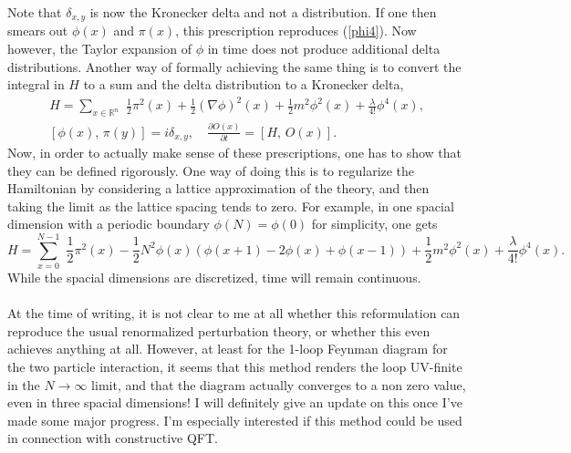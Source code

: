 \documentclass{article}
\begin{document}
Note that $\delta_{x,y}$ is now the Kronecker delta and not a distribution.
If one then smears out $\phi(x)$ and $\pi(x)$, this prescription reproduces (\ref{phi4}).
Now however, the Taylor expansion of $\phi$ in time does not produce additional delta distributions.
Another way of formally achieving the same thing is to convert the integral in $H$ to a sum and the delta distribution to a Kronecker delta,
\begin{equation}\begin{gathered}
    H = \sum_{x\in \mathbb{R}^n} \,\, \frac{1}{2} \pi^2(x) + \frac{1}{2} (\nabla\phi)^2(x) + \frac{1}{2} m^2\phi^2(x) + \frac{\lambda}{4!} \phi^4(x),\\
    \left[\phi(x),\,\pi(y)\right] = i\delta_{x, y}, \quad \frac{\partial O(x)}{\partial t} = \left[H,\,O(x)\right].
\end{gathered}\end{equation}
Now, in order to actually make sense of these prescriptions, one has to show that they can be defined rigorously.
One way of doing this is to regularize the Hamiltonian by considering a lattice approximation of the theory,
and then taking the limit as the lattice spacing tends to zero. For example, in one spacial dimension with a periodic boundary $\phi(N) = \phi(0)$ for simplicity, one gets
\begin{equation}
    H = \sum_{x = 0}^{N-1} \,\, \frac{1}{2} \pi^2(x) - \frac{1}{2} N^2 \phi(x)\left( \phi(x+1) - 2\phi(x) + \phi(x-1) \right) + \frac{1}{2} m^2\phi^2(x) + \frac{\lambda}{4!} \phi^4(x).
\end{equation}
While the spacial dimensions are discretized, time will remain continuous.\\\\
At the time of writing, it is not clear to me at all whether this reformulation can reproduce the usual renormalized perturbation theory,
or whether this even achieves anything at all. However, at least for the 1-loop Feynman diagram for the two particle interaction,
it seems that this method renders the loop UV-finite in the $N \rightarrow \infty$ limit,
and that the diagram actually converges to a non zero value, even in three spacial dimensions!
I will definitely give an update on this once I've made some major progress. I'm especially interested if
this method could be used in connection with constructive QFT.
\end{document}
